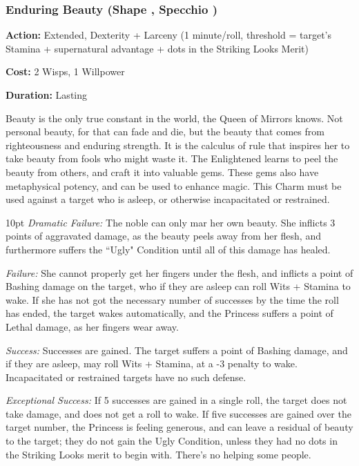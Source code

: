 \subsubsection*{Enduring Beauty (Shape \textbullet\textbullet\textbullet\textbullet, Specchio \textbullet\textbullet\textbullet\textbullet)}

\noindent \textbf{Action:} Extended, Dexterity + Larceny (1 minute/roll, threshold = target's Stamina + supernatural advantage + dots in the Striking Looks Merit)

\noindent \textbf{Cost:} 2 Wisps, 1 Willpower

\noindent \textbf{Duration:} Lasting

Beauty is the only true constant in the world, the Queen of Mirrors knows. Not personal beauty, for that can fade and die, but the beauty that comes from righteousness and enduring strength. It is the calculus of rule that inspires her to take beauty from fools who might waste it. The Enlightened learns to peel the beauty from others, and craft it into valuable gems. These gems also have metaphysical potency, and can be used to enhance magic. This Charm must be used against a target who is asleep, or otherwise incapacitated or restrained.

\begin{myindentpar}{10pt}    \emph{Dramatic Failure:} The noble can only mar her own beauty. She inflicts 3 points of aggravated damage, as the beauty peels away from her flesh, and furthermore suffers the \textquotedblleft Ugly" Condition until all of this damage has healed.

    \emph{Failure:} She cannot properly get her fingers under the flesh, and inflicts a point of Bashing damage on the target, who if they are asleep can roll Wits + Stamina to wake. If she has not got the necessary number of successes by the time the roll has ended, the target wakes automatically, and the Princess suffers a point of Lethal damage, as her fingers wear away.

    \emph{Success:} Successes are gained. The target suffers a point of Bashing damage, and if they are asleep, may roll Wits + Stamina, at a -3 penalty to wake. Incapacitated or restrained targets have no such defense.

    \emph{Exceptional Success:} If 5 successes are gained in a single roll, the target does not take damage, and does not get a roll to wake. If five successes are gained over the target number, the Princess is feeling generous, and can leave a residual of beauty to the target; they do not gain the Ugly Condition, unless they had no dots in the Striking Looks merit to begin with. There's no helping some people.\end{myindentpar}

